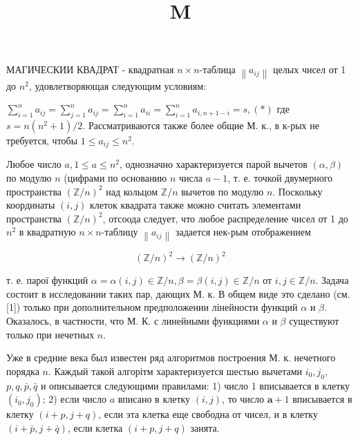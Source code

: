 \documentclass[10pt]{article}
\title{M }
\author{}
\date{}
\begin{document}
\maketitle

МАГИЧЕСКИИ КВАДРАТ - квадратная $n \times n$-таблица $\left\|a_{i j}\right\|$ целых чисел от 1 до $n^{2}$, удовлетворяющая следующим условиям:



$\sum_{i=1}^{n} a_{i j}=\sum_{j=1}^{n} a_{i j}=\sum_{i=1}^{n} a_{i i}=\sum_{i=1}^{n} a_{i, n+1-i}=s,(*)$ где $s=n\left(n^{2}+1\right) / 2$. Рассматриваются также более общие М. к., в к-рых не требуется, чтобы $1 \leqslant a_{i j} \leqslant n^{2}$.



Любое число $a, 1 \leqslant a \leqslant n^{2}$, однозначно характеризуется парой вычетов $(\alpha, \beta)$ по модулю $n$ (цифрами по основанию $n$ числа $a-1$, т. е. точкой двумерного пространства $(\mathbb{Z} / n)^{2}$ над кольцом $\mathbb{Z} / n$ вычетов по модулю $n$. Поскольку координаты $(i, j)$ клеток квадрата также можно считать элементами пространства $(\mathbb{Z} / n)^{2}$, отсоода следует, что любое распределение чисел от 1 до $n^{2}$ в квадратную $n \times n$-таблицу $\left\|a_{i j}\right\|$ задается нек-рым отображением



\[

(\mathbb{Z} / n)^{2} \longrightarrow(\mathbb{Z} / n)^{2}

\]



т. е. парої функций $\alpha=\alpha(i, j) \in \mathbb{Z} / n, \beta=\beta(i, j) \in \mathbb{Z} / n$ от $i, j \in \mathbb{Z} / n$. Задача состоит в исследовании таких пар, дающих М. к. В общем виде это сделано (см. [1]) только при дополнительном предположении лінейности функций $\alpha$ и $\beta$. Оказалось, в частности, что М. К. с линейными функциями $\alpha$ и $\beta$ существуют только при нечетных $n$.



Уже в средние века был известен ряд алгоритмов построения М. к. нечетного порядка $n$. Каждый такой алгорітм характеризуется шестью вычетами $i_{0}, j_{0}$, $p, q, \bar{p}, \bar{q}$ и описывается следующими правилами: 1) число 1 вписывается в клетку $\left(i_{0}, j_{0}\right)$; 2) если число $a$ вписано в клетку $(i, j)$, то число $\boldsymbol{a}+1$ вписывается в клетку $(i+p, j+q)$, если эта клетка еще свободна от чисел, и в клетку $(i+\bar{p}, j+\bar{q})$, если клетка $(i+p, j+q)$ занята.
\end{document}

